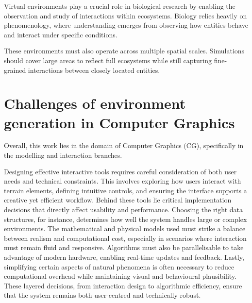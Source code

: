 Virtual environments play a crucial role in biological research by enabling the observation and study of interactions within ecosystems. Biology relies heavily on phenomenology, where understanding emerges from observing how entities behave and interact under specific conditions.


These environments must also operate across multiple spatial scales. Simulations should cover large areas to reflect full ecosystems while still capturing fine-grained interactions between closely located entities.

\section{Challenges of environment generation in Computer Graphics}

Overall, this work lies in the domain of Computer Graphics (CG), specifically in the modelling and interaction branches.

Designing effective interactive tools requires careful consideration of both user needs and technical constraints. This involves exploring how users interact with terrain elements, defining intuitive controls, and ensuring the interface supports a creative yet efficient workflow. Behind these tools lie critical implementation decisions that directly affect usability and performance. Choosing the right data structures, for instance, determines how well the system handles large or complex environments. The mathematical and physical models used must strike a balance between realism and computational cost, especially in scenarios where interaction must remain fluid and responsive. Algorithms must also be parallelisable to take advantage of modern hardware, enabling real-time updates and feedback. Lastly, simplifying certain aspects of natural phenomena is often necessary to reduce computational overhead while maintaining visual and behavioural plausibility. These layered decisions, from interaction design to algorithmic efficiency, ensure that the system remains both user-centred and technically robust.





